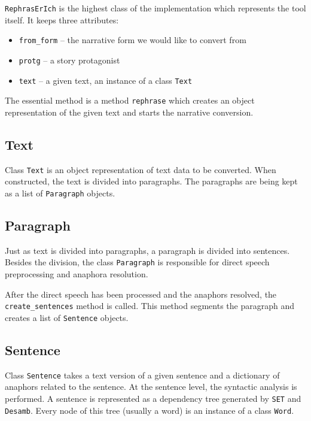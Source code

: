 \texttt{RephrasErIch} is the highest class of the implementation which represents the tool itself. It keeps three attributes:

\begin{itemize}
	\item \texttt{from\_form} -- the narrative form we would like to convert from
	\item \texttt{protg} -- a story protagonist
	\item \texttt{text} -- a given text, an instance of a class \texttt{Text}
\end{itemize}

The essential method is a method \texttt{rephrase} which creates an object representation of the given text and starts the narrative conversion.

\subsection{Text}

Class \texttt{Text} is an object representation of text data to be converted. When constructed, the text is divided into paragraphs. The paragraphs are being kept as a list of \texttt{Paragraph} objects.

\subsection{Paragraph}

Just as text is divided into paragraphs, a paragraph is divided into sentences. Besides the division, the class \texttt{Paragraph} is responsible for direct speech preprocessing and anaphora resolution.

After the direct speech has been processed and the anaphors resolved, the \texttt{create\_sentences} method is called. This method segments the paragraph and creates a list of \texttt{Sentence} objects.

\subsection{Sentence}

Class \texttt{Sentence} takes a text version of a given sentence and a dictionary of anaphors related to the sentence. At the sentence level, the syntactic analysis is performed. A sentence is represented as a dependency tree generated by \texttt{SET} and \texttt{Desamb}. Every node of this tree (usually a word) is an instance of a class \texttt{Word}.

